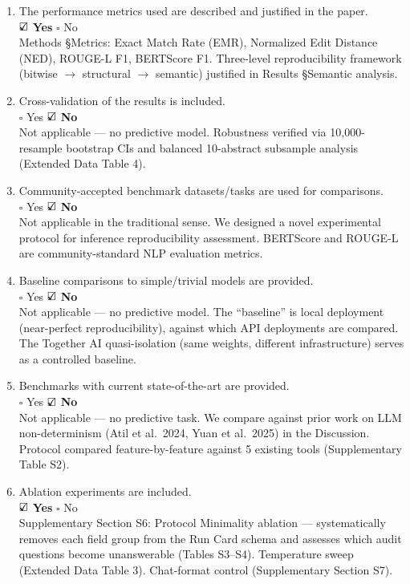 \documentclass[11pt]{article}
\newcommand{\yes}{\rlap{$\checkmark$}\square}
\newcommand{\no}{\square}
\begin{document}
\begin{enumerate}[label=\Alph*.,leftmargin=2em]
\item The performance metrics used are described and justified in the paper.\\
$\yes$ \textbf{Yes} \quad $\no$ No\\
{\small Methods \S Metrics: Exact Match Rate (EMR), Normalized Edit Distance (NED), ROUGE-L F1, BERTScore F1. Three-level reproducibility framework (bitwise $\to$ structural $\to$ semantic) justified in Results \S Semantic analysis.}

\item Cross-validation of the results is included.\\
$\no$ Yes \quad $\yes$ \textbf{No}\\
{\small Not applicable --- no predictive model. Robustness verified via 10,000-resample bootstrap CIs and balanced 10-abstract subsample analysis (Extended Data Table 4).}

\item Community-accepted benchmark datasets/tasks are used for comparisons.\\
$\no$ Yes \quad $\yes$ \textbf{No}\\
{\small Not applicable in the traditional sense. We designed a novel experimental protocol for inference reproducibility assessment. BERTScore and ROUGE-L are community-standard NLP evaluation metrics.}

\item Baseline comparisons to simple/trivial models are provided.\\
$\no$ Yes \quad $\yes$ \textbf{No}\\
{\small Not applicable --- no predictive model. The ``baseline'' is local deployment (near-perfect reproducibility), against which API deployments are compared. The Together AI quasi-isolation (same weights, different infrastructure) serves as a controlled baseline.}

\item Benchmarks with current state-of-the-art are provided.\\
$\no$ Yes \quad $\yes$ \textbf{No}\\
{\small Not applicable --- no predictive task. We compare against prior work on LLM non-determinism (Atil et al.\ 2024, Yuan et al.\ 2025) in the Discussion. Protocol compared feature-by-feature against 5 existing tools (Supplementary Table S2).}

\item Ablation experiments are included.\\
$\yes$ \textbf{Yes} \quad $\no$ No\\
{\small Supplementary Section S6: Protocol Minimality ablation --- systematically removes each field group from the Run Card schema and assesses which audit questions become unanswerable (Tables S3--S4). Temperature sweep (Extended Data Table 3). Chat-format control (Supplementary Section S7).}


\end{enumerate}
\end{document}
